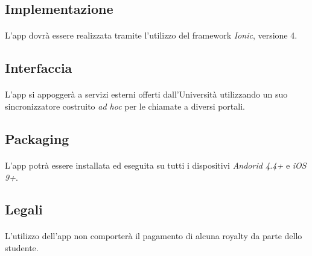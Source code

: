 \subsection{Implementazione}
\paragraph{}
L’app dovrà essere realizzata tramite l’utilizzo del framework \textit{Ionic}, versione 4.

\subsection{Interfaccia}
\paragraph{}
L’app si appoggerà a servizi esterni offerti dall’Università utilizzando un suo sincronizzatore costruito \textit{ad hoc} per le chiamate a diversi portali.

\subsection{Packaging}
\paragraph{}
L’app potrà essere installata ed eseguita su tutti i dispositivi \textit{Andorid 4.4+} e \textit{iOS 9+}.

\subsection{Legali}
\paragraph{}
L’utilizzo dell’app non comporterà il pagamento di alcuna royalty da parte dello studente.

\clearpage
